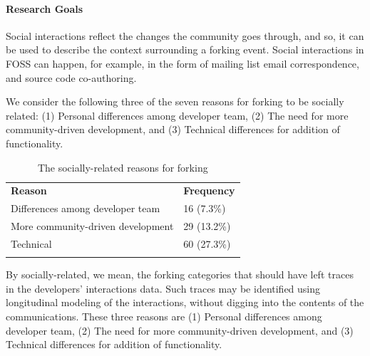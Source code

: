 \documentclass[12pt]{report}
\begin{document}
\paragraph{Research Goals}
\label{ResearchGoals}
\label{ResearchObjective}

Social interactions reflect the changes the community goes through, and so, it can be used to describe the context surrounding a forking event. Social interactions in FOSS can happen, for example, in the form of mailing list email correspondence, and source code co-authoring. 

We consider the following three of the seven reasons for forking \cite{Robles} to be socially related: (1) Personal differences among developer team, (2) The need for more community-driven development, and (3) Technical differences for addition of functionality. 

\begin{table}[!ht]
\centering
\caption[The socially-related forking reasons]{The socially-related reasons for forking }
\label{tableReasonsForForkingSociallyRelated}
\begin{tabular}{p{} p{}}
\hline\noalign{\smallskip}
\textbf{Reason} & \textbf{Frequency} \\
\noalign{\smallskip}\hline\noalign{\smallskip}
Differences among developer team &  16 (7.3\%)  \\ \hline
More community-driven development & 29 (13.2\%) \\ \hline
Technical & 60 (27.3\%)\\ 
\noalign{\smallskip}\hline
\end{tabular}
\end{table}

By socially-related, we mean, the forking categories that should have left traces in the developers' interactions data. Such traces may be identified using longitudinal modeling of the interactions, without digging into the contents of the communications. These three reasons are (1) Personal differences among developer team, (2) The need for more community-driven development, and (3) Technical differences for addition of functionality. 
\end{document}
